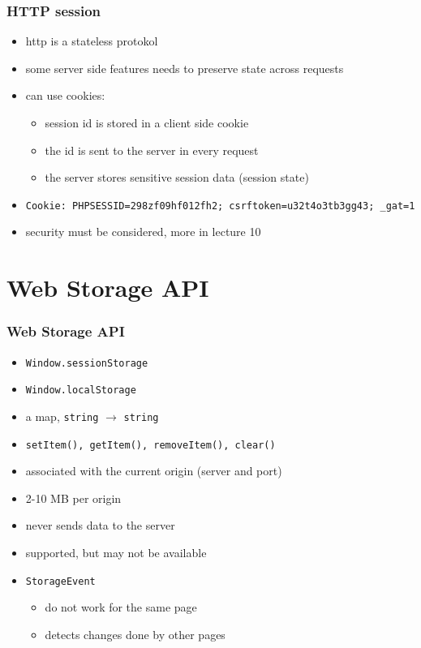 \begin{frame}[fragile]\frametitle{HTTP session}
\color{structure}
\begin{itemize}\color{structure}
  \item http is a stateless protokol
  \item some server side features needs to preserve state across requests
  \item can use cookies:
  \begin{itemize}
    \item session id is stored in a client side cookie
    \item the id is sent to the server in every request
    \item the server stores sensitive session data (session state)
  \end{itemize}
  \item \texttt{Cookie: PHPSESSID=298zf09hf012fh2; csrftoken=u32t4o3tb3gg43; \_gat=1}
  \item security must be considered, more in lecture 10
\end{itemize}
\end{frame}

\section{Web Storage API}
\begin{frame}[fragile]\frametitle{Web Storage API}
\color{structure}

\begin{itemize}\color{structure}
  \item \texttt{Window.sessionStorage}
  \item \texttt{Window.localStorage}
  \item a map, \texttt{string} $\rightarrow$ \texttt{string}
  \item \texttt{setItem(), getItem(), removeItem(), clear()}
  \item associated with the current origin (server and port)
  \item 2-10 MB per origin
  \item never sends data to the server
  \item supported, but may not be available
  \item \texttt{StorageEvent}
  \begin{itemize}
    \item do not work for the same page
    \item detects changes done by other pages
  \end{itemize}
\end{itemize}
\end{frame}

